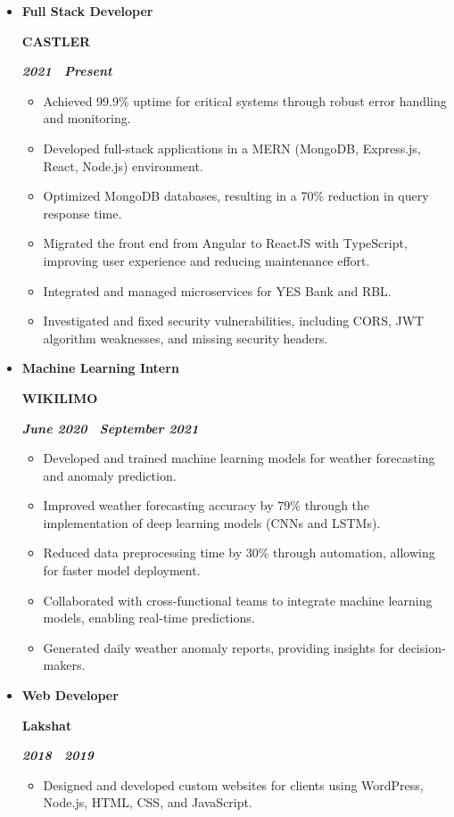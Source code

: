 \documentclass[10pt,letterpaper]{article}
\newcommand{\textbox}[1]{
  \parbox{.333\textwidth}{#1}
}
\newcommand{\titleExperienceWithoutLocation}[4]{
  \vspace{1.0em}
  \item[]
  {
    \textbox{\textbf{#1}\hfill}\textbox{\hfil \textbf{#2}\hfil}\hfill \textbf{\emph{#3 \textendash \ #4}}
  }
}
\begin{document}
  \begin{itemize}[noitemsep,topsep=0pt]
    
    \titleExperienceWithoutLocation{Full Stack Developer}{CASTLER}{2021}{Present}
    \begin{itemize}[label=\textbullet,noitemsep,topsep=0pt]
      \item Achieved 99.9\% uptime for critical systems through robust error handling and monitoring.
      \item Developed full-stack applications in a MERN (MongoDB, Express.js, React, Node.js) environment.
      \item Optimized MongoDB databases, resulting in a 70\% reduction in query response time.
      \item Migrated the front end from Angular to ReactJS with TypeScript, improving user experience and reducing maintenance effort.
      \item Integrated and managed microservices for YES Bank and RBL.
      \item Investigated and fixed security vulnerabilities, including CORS, JWT algorithm weaknesses, and missing security headers.
    \end{itemize}
  
    \titleExperienceWithoutLocation{Machine Learning Intern}{WIKILIMO}{June 2020}{September 2021}
    \begin{itemize}[label=\textbullet,noitemsep,topsep=0pt]
      \item Developed and trained machine learning models for weather forecasting and anomaly prediction.
      \item Improved weather forecasting accuracy by 79\% through the implementation of deep learning models (CNNs and LSTMs).
      \item Reduced data preprocessing time by 30\% through automation, allowing for faster model deployment.
      \item Collaborated with cross-functional teams to integrate machine learning models, enabling real-time predictions.
      \item Generated daily weather anomaly reports, providing insights for decision-makers.
    \end{itemize}
  
    \titleExperienceWithoutLocation{Web Developer}{Lakshat}{2018}{2019}
    \begin{itemize}[label=\textbullet,noitemsep,topsep=0pt]
      \item Designed and developed custom websites for clients using WordPress, Node.js, HTML, CSS, and JavaScript.
    \end{itemize}
  \end{itemize}
\end{document}
